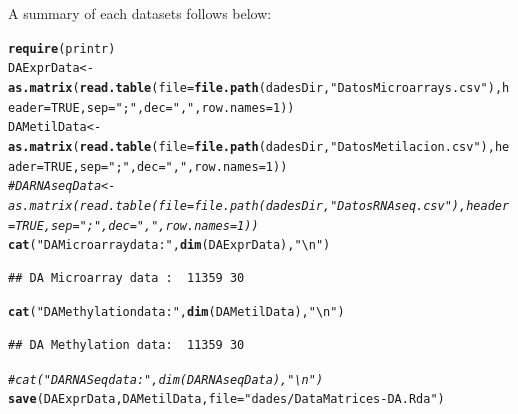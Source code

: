 \documentclass[a4paper,10pt]{article}\usepackage[]{graphicx}\usepackage[]{xcolor}
\makeatletter
\newcommand{\hlnum}[1]{\textcolor[rgb]{0.686,0.059,0.569}{#1}}%
\newcommand{\hlstr}[1]{\textcolor[rgb]{0.192,0.494,0.8}{#1}}%
\newcommand{\hlcom}[1]{\textcolor[rgb]{0.678,0.584,0.686}{\textit{#1}}}%
\newcommand{\hlstd}[1]{\textcolor[rgb]{0.345,0.345,0.345}{#1}}%
\newcommand{\hlkwb}[1]{\textcolor[rgb]{0.69,0.353,0.396}{#1}}%
\newcommand{\hlkwc}[1]{\textcolor[rgb]{0.333,0.667,0.333}{#1}}%
\newcommand{\hlkwd}[1]{\textcolor[rgb]{0.737,0.353,0.396}{\textbf{#1}}}%
\newenvironment{kframe}{%
 \def\at@end@of@kframe{}%
 \ifinner\ifhmode%
  \def\at@end@of@kframe{\end{minipage}}%
  \begin{minipage}{\columnwidth}%
 \fi\fi%
 \def\FrameCommand##1{\hskip\@totalleftmargin \hskip-\fboxsep
 \colorbox{shadecolor}{##1}\hskip-\fboxsep
     \hskip-\linewidth \hskip-\@totalleftmargin \hskip\columnwidth}%
 \MakeFramed {\advance\hsize-\width
   \@totalleftmargin\z@ \linewidth\hsize
   \@setminipage}}%
 {\par\unskip\endMakeFramed%
 \at@end@of@kframe}
\newenvironment{knitrout}{}{} %
\makeatother
\begin{document}
A summary of each datasets follows below:

\begin{knitrout}
\color{fgcolor}\begin{kframe}
\begin{alltt}
\hlkwd{require}\hlstd{(printr)}
\hlstd{DAExprData} \hlkwb{<-} \hlkwd{as.matrix}\hlstd{(}\hlkwd{read.table}\hlstd{(}\hlkwc{file}\hlstd{=}\hlkwd{file.path}\hlstd{(dadesDir,}\hlstr{"DatosMicroarrays.csv"}\hlstd{),} \hlkwc{header}\hlstd{=}\hlnum{TRUE}\hlstd{,} \hlkwc{sep}\hlstd{=}\hlstr{";"}\hlstd{,} \hlkwc{dec}\hlstd{=}\hlstr{","}\hlstd{,} \hlkwc{row.names} \hlstd{=} \hlnum{1}\hlstd{))}
\hlstd{DAMetilData} \hlkwb{<-} \hlkwd{as.matrix}\hlstd{(}\hlkwd{read.table}\hlstd{(}\hlkwc{file}\hlstd{=}\hlkwd{file.path}\hlstd{(dadesDir,}\hlstr{"DatosMetilacion.csv"}\hlstd{),} \hlkwc{header}\hlstd{=}\hlnum{TRUE}\hlstd{,} \hlkwc{sep}\hlstd{=}\hlstr{";"}\hlstd{,}\hlkwc{dec}\hlstd{=}\hlstr{","}\hlstd{,} \hlkwc{row.names} \hlstd{=} \hlnum{1}\hlstd{))}
\hlcom{#DARNAseqData <- as.matrix(read.table(file=file.path(dadesDir,"DatosRNAseq.csv"), header=TRUE, sep=";",dec=",", row.names = 1))}
\hlkwd{cat}\hlstd{(}\hlstr{"DA Microarray data : "}\hlstd{,} \hlkwd{dim}\hlstd{(DAExprData),} \hlstr{"\textbackslash{}n"}\hlstd{)}
\end{alltt}
\begin{verbatim}
## DA Microarray data :  11359 30
\end{verbatim}
\begin{alltt}
\hlkwd{cat}\hlstd{(}\hlstr{"DA Methylation data: "}\hlstd{,} \hlkwd{dim}\hlstd{(DAMetilData),} \hlstr{"\textbackslash{}n"}\hlstd{)}
\end{alltt}
\begin{verbatim}
## DA Methylation data:  11359 30
\end{verbatim}
\begin{alltt}
\hlcom{# cat("DA RNASeq data     : ", dim(DARNAseqData), "\textbackslash{}n")}
\hlkwd{save}\hlstd{(DAExprData, DAMetilData,} \hlkwc{file}\hlstd{=}\hlstr{"dades/DataMatrices-DA.Rda"}\hlstd{)}
\end{alltt}
\end{kframe}
\end{knitrout}
\end{document}
